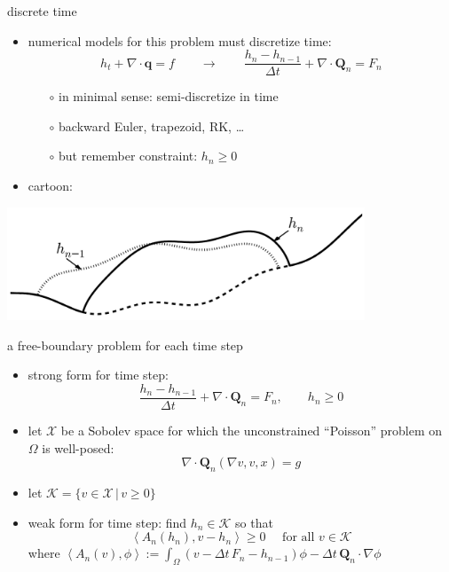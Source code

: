 \documentclass[hide notes,intlimits]{beamer}
\newcommand{\Kcal}{\mathcal{K}}
\newcommand{\Xcal}{\mathcal{X}}
\newcommand{\bQ}{\mathbf{Q}}
\newcommand{\bq}{\mathbf{q}}
\newcommand{\Div}{\nabla\cdot}
\newcommand{\grad}{\nabla}
\newcommand{\ip}[2]{\ensuremath{\left<#1,#2\right>}}
\begin{document}
\begin{frame}{discrete time}
\begin{itemize}
\item numerical models for this problem must discretize time:
  $$h_t + \Div \bq = f \qquad \longrightarrow \qquad \frac{h_n - h_{n-1}}{\Delta t} + \Div \bQ_n = F_n$$
  \begin{itemize}
  \vspace{-3mm}
  \item[$\circ$] in minimal sense: semi-discretize in time
  \item[$\circ$] backward Euler, trapezoid, RK, \dots
  \item[$\circ$] but remember constraint: $h_n \ge 0$
  \end{itemize}
\item cartoon:
\end{itemize}
\begin{center}
\includegraphics[width=0.8\textwidth,keepaspectratio=true]{cartoon-sets-crop}
\end{center}
\end{frame}


\begin{frame}{a free-boundary problem for each time step}
\begin{itemize}
\item strong form for time step:
  $$\frac{h_n - h_{n-1}}{\Delta t} + \Div \bQ_n = F_n, \qquad h_n \ge 0$$
\item let $\Xcal$ be a Sobolev space for which the unconstrained ``Poisson'' problem on $\Omega$ is well-posed:
  $$\Div \bQ_n(\grad v,v,x) = g$$
\item let $\Kcal = \{v \in \Xcal\,\big|\, v\ge 0\}$
\item weak form for time step: find $h_n \in \Kcal$ so that
  $$\ip{A_n(h_n)}{v-h_n} \ge 0 \quad \text{ for all } v \in \Kcal$$
where $\ip{A_n(v)}{\phi} := \int_\Omega \left(v - \Delta t\, F_n - h_{n-1}\right)\phi - \Delta t\, \bQ_n \cdot \grad\phi$
\end{itemize}
\end{frame}
\end{document}
